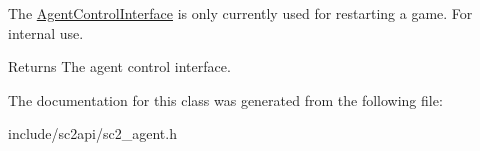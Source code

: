 The \hyperlink{classsc2_1_1_agent_control_interface}{Agent\+Control\+Interface} is only currently used for restarting a game. For internal use. \begin{DoxyReturn}{Returns}
The agent control interface. 
\end{DoxyReturn}


The documentation for this class was generated from the following file\+:\begin{DoxyCompactItemize}
\item 
include/sc2api/sc2\+\_\+agent.\+h\end{DoxyCompactItemize}
